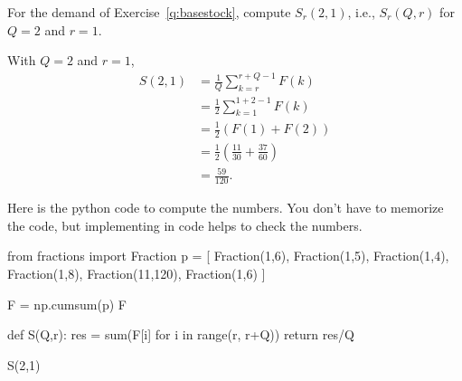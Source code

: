 \begin{exercise}
  For the demand of Exercise~\ref{q:basestock}, compute $S_r(2,1)$, i.e., $S_r(Q, r)$ for $Q=2$ and $r=1$. 

\begin{solution}
With $Q=2$ and $r=1$,
  \begin{align*}
      S(2,1)
&= \frac{1}Q\sum_{k=r}^{r+Q-1} F(k) \\
&= \frac{1}2\sum_{k=1}^{1+2-1} F(k) \\
&=  \frac 12 (F(1) + F(2) ) \\
&= \frac12\left(\frac{11}{30} + \frac{37}{60}\right) \\
&=\frac{59}{120}.
  \end{align*}

Here is the python code to compute the numbers. You don't have to memorize the code, but implementing in code helps to check the numbers.
  \begin{pyconsole}
from fractions import Fraction
p = [ Fraction(1,6),
      Fraction(1,5),
      Fraction(1,4),
      Fraction(1,8),
      Fraction(11,120),
      Fraction(1,6)
      ]

F = np.cumsum(p)
F

def S(Q,r):
    res = sum(F[i] for i in range(r, r+Q))
    return res/Q

S(2,1)
  \end{pyconsole}
\end{solution}
\end{exercise}



%

